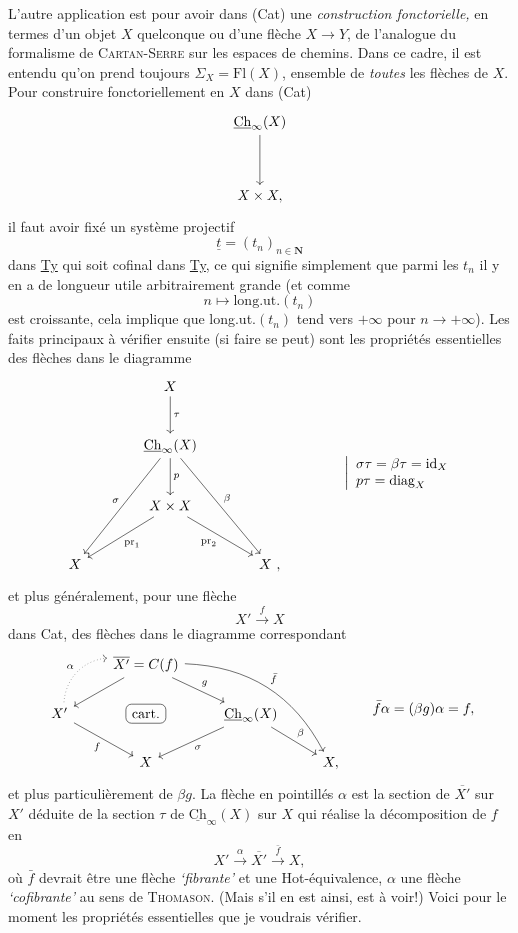 \documentclass[11pt]{article}
\newcommand{\printedpage}[1]{\marginpar{\footnotesize p.~#1}}
\newcommand{\msp}[1]{\marginpar{\footnotesize [#1]}}
\newcommand{\uCh}{\underline{\mathrm{Ch}}}
\begin{document}
L'autre application est pour avoir dans (Cat) une \textit{construction fonctorielle,} en termes d'un objet $X$ quelconque ou d'une flèche $X\longrightarrow Y$, de l'analogue du formalisme de \textsc{Cartan-Serre} sur les espaces de chemins. Dans ce cadre, il est entendu qu'on prend toujours $\Sigma_X=\mathrm{Fl}(X)$, ensemble de \textit{toutes} les flèches de $X$. Pour construire fonctoriellement en $X$ dans (Cat)
\[
\begin{tikzcd}[row sep=huge]
\uCh_\infty(X) \arrow[d] \\
X\times X,
\end{tikzcd}
\]
il faut avoir fixé un système projectif
\[
\underline{t}=(t_n)_{n\in\mathbf{N}}
\]
\msp{page 138}
dans \underline{Ty} qui soit cofinal dans \underline{Ty}, ce qui signifie simplement que parmi les $t_n$ il y en a de longueur utile arbitrairement grande (et comme
\[
n\longmapsto\mathrm{long.ut.}(t_n)
\]
est croissante, cela implique que long.ut.$(t_n)$ tend vers $+\infty$ pour $n\longrightarrow+\infty$). Les faits principaux à vérifier ensuite (si faire se peut) sont les propriétés essentielles des flèches dans le diagramme
\printedpage{86}
\[
\begin{tikzcd}[column sep=large, row sep=large]
& X \arrow[d, "\tau"] & \\
& \uCh_\infty(X) \arrow[d, "p"] \arrow[ddl, "\sigma"'] \arrow[ddr, "\beta"] & \\
& X\times X \arrow[dl, "\mathrm{pr}_1"] \arrow[dr, "\mathrm{pr}_2"'] & \\
X & & X\ ,
\end{tikzcd}
\qquad\qquad
\left|\begin{array}{l}
\sigma\tau=\beta\tau=\mathrm{id}_X\\
p\tau=\mathrm{diag}_X
\end{array}\right.
\]
et plus généralement, pour une flèche
\[
X'\xrightarrow{\ f\ }X
\]
dans Cat, des flèches dans le diagramme correspondant
\[
\begin{tikzcd}
& \overline{X'}=C(f) \arrow[dl] \arrow[dr, "g"] \arrow[ddrr, bend left=30, "\bar{f}"] & & \\
X' \arrow[ur, dotted, bend left=40, "\alpha"] \arrow[dr, "f"'] & |[draw, rounded corners]| \text{cart.} & \uCh_\infty(X) \arrow[dl, "\sigma"] \arrow[dr, "\beta"] & \\
& X & & X,
\end{tikzcd}
\qquad
\bar{f}\alpha=(\beta g)\alpha=f,
\]
et plus particulièrement de $\beta g$. La flèche
\msp{page 139}
en pointillés $\alpha$ est la section de $\overline{X'}$ sur $X'$ déduite de la section $\tau$ de $\uCh_\infty(X)$ sur $X$ qui réalise la décomposition de $f$ en
\[
X'\xrightarrow{\ \alpha\ }\overline{X'}\xrightarrow{\ \bar{f}\ }X,
\]
où $\bar{f}$ devrait être une flèche \textit{`fibrante'} et une Hot-équivalence, $\alpha$ une flèche \textit{`cofibrante'} au sens de \textsc{Thomason}. (Mais s'il en est ainsi, est à voir!) Voici pour le moment les propriétés essentielles que je voudrais vérifier.
\end{document}
